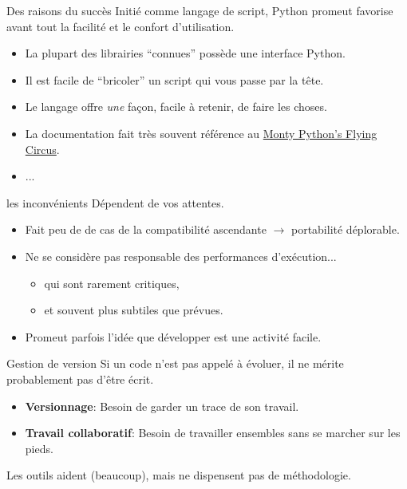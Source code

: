 \documentclass{beamer}
\begin{document}
\begin{frame}{Des raisons du succès}
  Initié comme langage de script, Python promeut favorise avant tout la facilité et le confort d'utilisation.
  \begin{itemize}
  \item La plupart des librairies ``connues'' possède une interface Python.
  \item Il est facile de ``bricoler'' un script qui vous passe par la tête.
  \item Le langage offre {\em une} façon, facile à retenir, de faire les choses.
  \item La documentation fait très souvent référence au \href{https://en.wikipedia.org/wiki/Monty_Python\%27s_Flying_Circus}{Monty Python's Flying Circus}.
  \item ...
  \end{itemize}
\end{frame}

\begin{frame}{les inconvénients}
  Dépendent de vos attentes.
  \begin{itemize}
  \item Fait peu de de cas de la compatibilité ascendante $\rightarrow$ portabilité déplorable.
  \item Ne se considère pas responsable des performances d'exécution...
    \begin{itemize}
    \item qui sont rarement critiques,
    \item et souvent plus subtiles que prévues. 
    \end{itemize}
  \item Promeut parfois l'idée que développer est une activité facile.
  \end{itemize}
\end{frame}

\begin{frame}{Gestion de version}
  Si un code n'est pas appelé à évoluer, il ne mérite probablement pas d'être écrit.
  \begin{itemize}
  \item {\bf Versionnage}: Besoin de garder un trace de son travail.
  \item {\bf Travail collaboratif}: Besoin de travailler ensembles sans se marcher sur les pieds.
  \end{itemize}
  Les outils aident (beaucoup), mais ne dispensent pas de méthodologie.
\end{frame}
\end{document}
